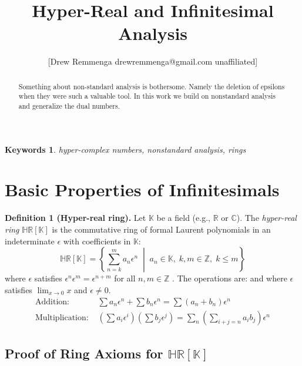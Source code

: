 \documentclass[10pt, oneside]{article}
\title{Hyper-Real and Infinitesimal Analysis}
\author{[Drew Remmenga drewremmenga@gmail.com unaffiliated]}
\newcommand{\HR}{\mathbb{HR}}
\newcommand{\K}{\mathbb{K}}
\newtheorem{keywords}{Keywords}
\begin{document}
\maketitle
\begin{abstract}
   Something about non-standard analysis is bothersome. Namely the deletion of epsilons when they were such a valuable tool. In this work we build on nonstandard analysis and generalize the dual numbers.
\end{abstract}
\begin{keywords}
   hyper-complex numbers, nonstandard analysis, rings
\end{keywords}
\section{Basic Properties of Infinitesimals}
\textbf{Definition 1 (Hyper-real ring).} Let $\K$ be a field (e.g., $\mathbb{R}$ or $\mathbb{C}$). The \emph{hyper-real ring} $\HR[\K]$ is the commutative ring of formal Laurent polynomials in an indeterminate $\epsilon$ with coefficients in $\K$:
\[
\HR[\K] = \left\{ \sum_{n=k}^{m} a_n \epsilon^n  \;\middle|\; a_n \in \K,\; k,m \in \mathbb{Z},\; k \leq m \right\}
\]
where $\epsilon$ satisfies $\epsilon^n \epsilon^m = \epsilon^{n+m}$ for all $n,m \in \mathbb{Z}$ \cite{robinson1966}. The operations are:
and where $\epsilon$ satisfies $\lim_{x \to 0} x$ and $\epsilon \neq 0$.
\begin{align*}
\text{Addition: } & \sum a_n \epsilon^n + \sum b_n \epsilon^n = \sum (a_n + b_n) \epsilon^n \\
\text{Multiplication: } & \left( \sum a_i \epsilon^i \right) \left( \sum b_j \epsilon^j \right) = \sum_{n} \left( \sum_{i+j=n} a_i b_j \right) \epsilon^n
\end{align*}


\subsection*{Proof of Ring Axioms for $\HR[\K]$}
\end{document}
